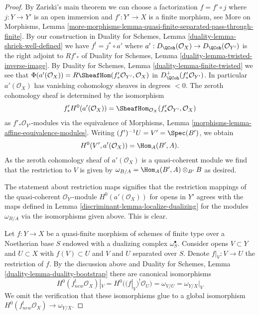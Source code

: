 \begin{proof}

By Zariski's main theorem we can choose a factorization $f = f' \circ j$
where $j : Y \to Y'$ is an open immersion and $f' : Y' \to X$ is a finite
morphism, see More on Morphisms, Lemma
\ref{more-morphisms-lemma-quasi-finite-separated-pass-through-finite}.
By our construction in
Duality for Schemes, Lemma \ref{duality-lemma-shriek-well-defined} we have
$f^! = j^* \circ a'$ where
$a' : D_\QCoh(\mathcal{O}_X) \to D_\QCoh(\mathcal{O}_{Y'})$
is the right adjoint to $Rf'_*$ of
Duality for Schemes, Lemma \ref{duality-lemma-twisted-inverse-image}.
By Duality for Schemes, Lemma \ref{duality-lemma-finite-twisted}
we see that
$\Phi(a'(\mathcal{O}_X)) = R\SheafHom(f'_*\mathcal{O}_{Y'}, \mathcal{O}_X)$ in
$D_\QCoh^+(f'_*\mathcal{O}_{Y'})$. In particular $a'(\mathcal{O}_X)$ has
vanishing cohomology sheaves in degrees $< 0$. The zeroth cohomology sheaf
is determined by the isomorphism
$$
f'_*H^0(a'(\mathcal{O}_X)) =
\SheafHom_{\mathcal{O}_X}(f'_*\mathcal{O}_{Y'}, \mathcal{O}_X)
$$
as $f'_*\mathcal{O}_{Y'}$-modules via the equivalence of
Morphisms, Lemma \ref{morphisms-lemma-affine-equivalence-modules}.
Writing $(f')^{-1}U = V' = \Spec(B')$, we obtain
$$
H^0(V', a'(\mathcal{O}_X)) = \Hom_A(B', A).
$$
As the zeroth cohomology sheaf of $a'(\mathcal{O}_X)$
is a quasi-coherent module we find that
the restriction to $V$ is given by
$\omega_{B/A} = \Hom_A(B', A) \otimes_{B'} B$ as desired.

\medskip\noindent
The statement about restriction maps signifies that the restriction mappings
of the quasi-coherent $\mathcal{O}_{Y'}$-module $H^0(a'(\mathcal{O}_X))$
for opens in $Y'$ agrees with the maps defined in
Lemma \ref{discriminant-lemma-localize-dualizing}
for the modules $\omega_{B/A}$ via the isomorphisms given above.
This is clear.

\medskip\noindent
Let $f : Y \to X$ be a quasi-finite morphism of schemes of finite type
over a Noetherian base $S$ endowed with a dualizing complex $\omega_S^\bullet$.
Consider opens $V \subset Y$ and $U \subset X$ with $f(V) \subset U$
and $V$ and $U$ separated over $S$. Denote $f|_V : V \to U$ the restriction
of $f$. By the discussion above and
Duality for Schemes, Lemma \ref{duality-lemma-duality-bootstrap}
there are canonical isomorphisms
$$
H^0(f_{new}^!\mathcal{O}_X)|_V = H^0((f|_V)^!\mathcal{O}_U) = \omega_{V/U} =
\omega_{Y/X}|_V
$$
We omit the verification that these isomorphisms glue to a global
isomorphism $H^0(f_{new}^!\mathcal{O}_X) \to \omega_{Y/X}$.
\end{proof}

